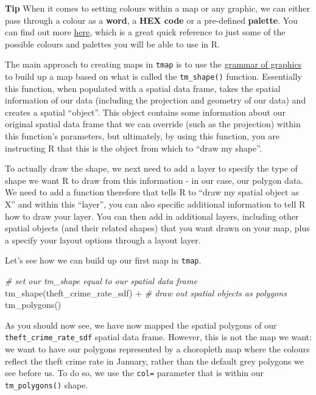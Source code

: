 \documentclass[
]{book}
\newenvironment{Shaded}{\begin{snugshade}}{\end{snugshade}}
\newcommand{\CommentTok}[1]{\textcolor[rgb]{0.56,0.35,0.01}{\textit{#1}}}
\newcommand{\FunctionTok}[1]{\textcolor[rgb]{0.00,0.00,0.00}{#1}}
\newcommand{\NormalTok}[1]{#1}
\newcommand{\SpecialCharTok}[1]{\textcolor[rgb]{0.00,0.00,0.00}{#1}}
\begin{document}
\textbf{Tip}
When it comes to setting colours within a map or any graphic, we can either pass through a colour as a \textbf{word}, a \textbf{HEX code} or a pre-defined \textbf{palette}. You can find out more \href{http://www.sthda.com/english/wiki/colors-in-r}{here}, which is a great quick reference to just some of the possible colours and palettes you will be able to use in R.

The main approach to creating maps in \texttt{tmap} is to use the \href{https://towardsdatascience.com/a-comprehensive-guide-to-the-grammar-of-graphics-for-effective-visualization-of-multi-dimensional-1f92b4ed4149}{grammar of graphics} to build up a map based on what is called the \texttt{tm\_shape()} function. Essentially this function, when populated with a spatial data frame, takes the spatial information of our data (including the projection and geometry of our data) and creates a spatial ``object''. This object contains some information about our original spatial data frame that we can override (such as the projection) within this function's parameters, but ultimately, by using this function, you are instructing R that this is the object from which to ``draw my shape''.

To actually draw the shape, we next need to add a layer to specify the type of shape we want R to draw from this information - in our case, our polygon data. We need to add a function therefore that tells R to ``draw my spatial object as X'' and within this ``layer'', you can also specific additional information to tell R how to draw your layer. You can then add in additional layers, including other spatial objects (and their related shapes) that you want drawn on your map, plus a specify your layout options through a layout layer.

Let's see how we can build up our first map in \texttt{tmap}.

\begin{Shaded}
\begin{Highlighting}[]
\CommentTok{\# set our tm\_shape equal to our spatial data frame}
\FunctionTok{tm\_shape}\NormalTok{(theft\_crime\_rate\_sdf) }\SpecialCharTok{+}
  \CommentTok{\# draw out spatial objects as polygons}
  \FunctionTok{tm\_polygons}\NormalTok{()}
\end{Highlighting}
\end{Shaded}

As you should now see, we have now mapped the spatial polygons of our \texttt{theft\_crime\_rate\_sdf} spatial data frame. However, this is not the map we want: we want to have our polygons represented by a choropleth map where the colours reflect the theft crime rate in January, rather than the default grey polygons we see before us. To do so, we use the \texttt{col=} parameter that is within our \texttt{tm\_polygons()} shape.
\end{document}
